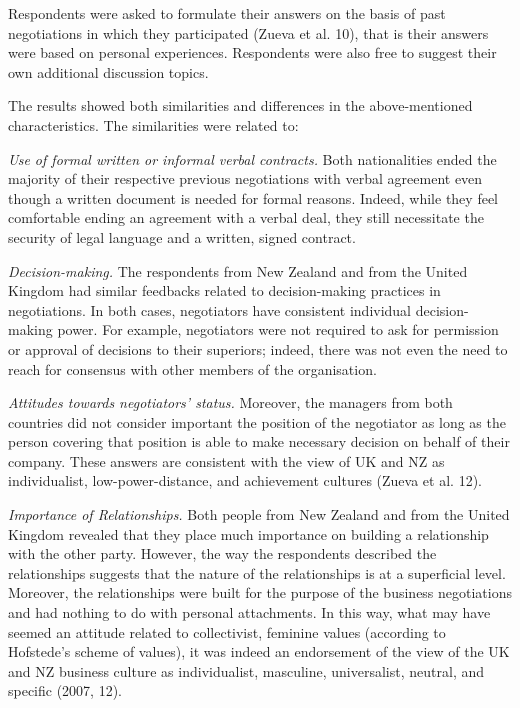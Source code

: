 \documentclass[../main.tex]{subfiles}
\begin{document}
Respondents were asked to formulate their answers on the basis of past negotiations in which they participated (Zueva et al. 10), that is their answers were based on personal experiences. Respondents were also free to suggest their own additional discussion topics.

The results showed both similarities and differences in the above-mentioned characteristics. The similarities were related to:

\textit{Use of formal written or informal verbal contracts.} Both nationalities ended the majority of their respective previous negotiations with verbal agreement even though a written document is needed for formal reasons. Indeed, while they feel comfortable ending an agreement with a verbal deal, they still necessitate the security of legal language and a written, signed contract.

\textit{Decision-making.} The respondents from New Zealand and from the United Kingdom had similar feedbacks related to decision-making practices in negotiations. In both cases, negotiators have consistent individual decision-making power. For example, negotiators were not required to ask for permission or approval of decisions to their superiors; indeed, there was not even the need to reach for consensus with other members of the organisation.

\textit{Attitudes towards negotiators’ status.} Moreover, the managers from both countries did not consider important the position of the negotiator as long as the person covering that position is able to make necessary decision on behalf of their company. These answers are consistent with the view of UK and NZ as individualist, low-power-distance, and achievement cultures (Zueva et al. 12).

\textit{Importance of Relationships.} Both people from New Zealand and from the United Kingdom revealed that they place much importance on building a relationship with the other party. However, the way the respondents described the relationships suggests that the nature of the relationships is at a superficial level. Moreover, the relationships were built for the purpose of the business negotiations and had nothing to do with personal attachments. In this way, what may have seemed an attitude related to collectivist, feminine values (according to Hofstede's scheme of values), it was indeed an endorsement of the view of the UK and NZ business culture as individualist, masculine, universalist, neutral, and specific (2007, 12).
\end{document}
